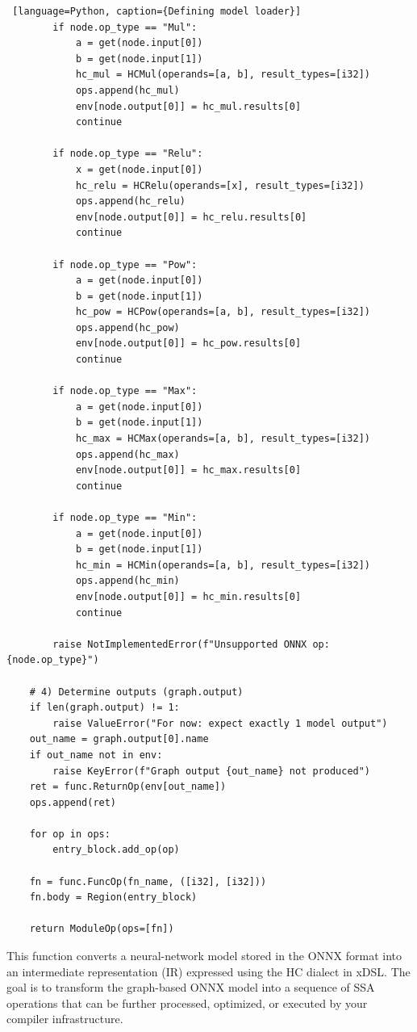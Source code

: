 \documentclass[../main.tex]{subfiles}
\begin{document}
\begin{lstlisting} [language=Python, caption={Defining model loader}]
        if node.op_type == "Mul":
            a = get(node.input[0])
            b = get(node.input[1])
            hc_mul = HCMul(operands=[a, b], result_types=[i32])
            ops.append(hc_mul)
            env[node.output[0]] = hc_mul.results[0]
            continue

        if node.op_type == "Relu":
            x = get(node.input[0])
            hc_relu = HCRelu(operands=[x], result_types=[i32])
            ops.append(hc_relu)
            env[node.output[0]] = hc_relu.results[0]
            continue

        if node.op_type == "Pow":
            a = get(node.input[0])
            b = get(node.input[1])
            hc_pow = HCPow(operands=[a, b], result_types=[i32])
            ops.append(hc_pow)
            env[node.output[0]] = hc_pow.results[0]
            continue

        if node.op_type == "Max":
            a = get(node.input[0])
            b = get(node.input[1])
            hc_max = HCMax(operands=[a, b], result_types=[i32])
            ops.append(hc_max)
            env[node.output[0]] = hc_max.results[0]
            continue

        if node.op_type == "Min":
            a = get(node.input[0])
            b = get(node.input[1])
            hc_min = HCMin(operands=[a, b], result_types=[i32])
            ops.append(hc_min)
            env[node.output[0]] = hc_min.results[0]
            continue

        raise NotImplementedError(f"Unsupported ONNX op: {node.op_type}")

    # 4) Determine outputs (graph.output)
    if len(graph.output) != 1:
        raise ValueError("For now: expect exactly 1 model output")
    out_name = graph.output[0].name
    if out_name not in env:
        raise KeyError(f"Graph output {out_name} not produced")
    ret = func.ReturnOp(env[out_name])
    ops.append(ret)

    for op in ops:
        entry_block.add_op(op)

    fn = func.FuncOp(fn_name, ([i32], [i32]))
    fn.body = Region(entry_block)

    return ModuleOp(ops=[fn])
\end{lstlisting}
This function converts a neural-network model stored in the ONNX format into an
intermediate representation (IR) expressed using the HC dialect in xDSL. The goal
is to transform the graph-based ONNX model into a sequence of SSA operations that
can be further processed, optimized, or executed by your compiler infrastructure.
\end{document}
